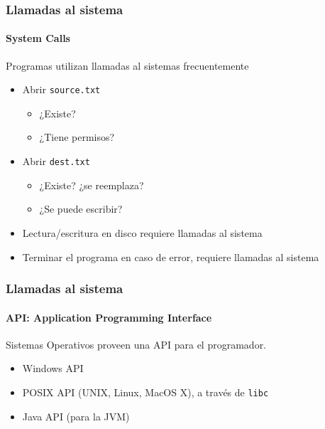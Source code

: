 \documentclass[letter]{beamer}
\begin{document}
\begin{frame}
  \frametitle{Llamadas al sistema}
  \framesubtitle{System Calls}
  
  Programas utilizan llamadas al sistemas frecuentemente
  
  \begin{itemize}
    \item<3-> Abrir {\tt source.txt}
      \begin{itemize}
        \item ¿Existe?
        \item ¿Tiene permisos?
      \end{itemize}
    \item<4-> Abrir {\tt dest.txt}
      \begin{itemize}
        \item ¿Existe? ¿se reemplaza?
        \item ¿Se puede escribir?
      \end{itemize}
    \item<5-> Lectura/escritura en disco requiere llamadas al sistema
    \item<6-> Terminar el programa en caso de error, requiere llamadas al sistema
  \end{itemize}

\end{frame}

\begin{frame}
  \frametitle{Llamadas al sistema}
  \framesubtitle{API: Application Programming Interface}
  
  Sistemas Operativos proveen una API para el programador.
  \begin{itemize}
    \item<2-> Windows API
    \item<3-> POSIX API (UNIX, Linux, MacOS X), a través de {\tt libc}
    \item<4-> Java API (para la JVM)
  \end{itemize}

  
\end{frame}
\end{document}
